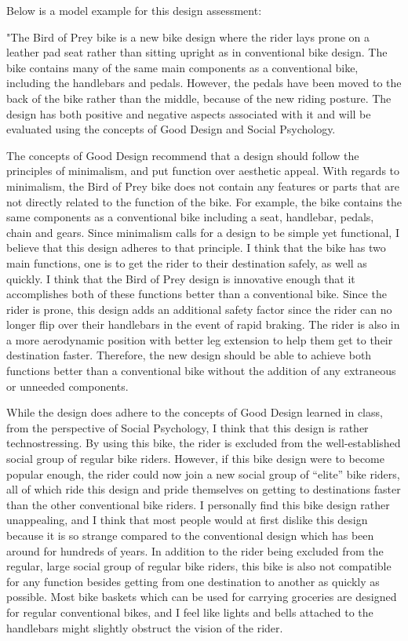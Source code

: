 \documentclass{article}
\begin{document}
Below is a model example for this design assessment:

"The Bird of Prey bike is a new bike design where the rider lays prone on a leather pad seat rather than sitting upright as in conventional bike design. The bike contains many of the same main components as a conventional bike, including the handlebars and pedals. However, the pedals have been moved to the back of the bike rather than the middle, because of the new riding posture. The design has both positive and negative aspects associated with it and will be evaluated using the concepts of Good Design and Social Psychology.



The concepts of Good Design recommend that a design should follow the principles of minimalism, and put function over aesthetic appeal. With regards to minimalism, the Bird of Prey bike does not contain any features or parts that are not directly related to the function of the bike. For example, the bike contains the same components as a conventional bike including a seat, handlebar, pedals, chain and gears. Since minimalism calls for a design to be simple yet functional, I believe that this design adheres to that principle. I think that the bike has two main functions, one is to get the rider to their destination safely, as well as quickly. I think that the Bird of Prey design is innovative enough that it accomplishes both of these functions better than a conventional bike. Since the rider is prone, this design adds an additional safety factor since the rider can no longer flip over their handlebars in the event of rapid braking. The rider is also in a more aerodynamic position with better leg extension to help them get to their destination faster. Therefore, the new design should be able to achieve both functions better than a conventional bike without the addition of any extraneous or unneeded components.



While the design does adhere to the concepts of Good Design learned in class, from the perspective of Social Psychology, I think that this design is rather technostressing. By using this bike, the rider is excluded from the well-established social group of regular bike riders. However, if this bike design were to become popular enough, the rider could now join a new social group of “elite” bike riders, all of which ride this design and pride themselves on getting to destinations faster than the other conventional bike riders. I personally find this bike design rather unappealing, and I think that most people would at first dislike this design because it is so strange compared to the conventional design which has been around for hundreds of years. In addition to the rider being excluded from the regular, large social group of regular bike riders, this bike is also not compatible for any function besides getting from one destination to another as quickly as possible. Most bike baskets which can be used for carrying groceries are designed for regular conventional bikes, and I feel like lights and bells attached to the handlebars might slightly obstruct the vision of the rider.
\end{document}
